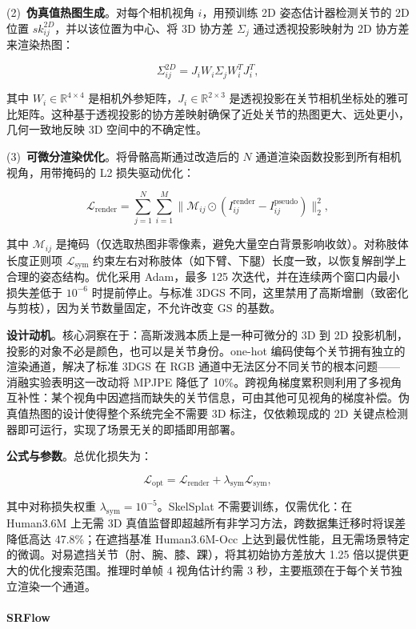(2)~\textbf{伪真值热图生成}。对每个相机视角 $i$，用预训练 2D 姿态估计器检测关节的 2D 位置 $sk_{ij}^{2D}$，并以该位置为中心、将 3D 协方差 $\Sigma_j$ 通过透视投影映射为 2D 协方差来渲染热图：

\[
\Sigma_{ij}^{2D} = J_i W_i \Sigma_j W_i^T J_i^T,
\]

其中 $W_i \in \mathbb{R}^{4 \times 4}$ 是相机外参矩阵，$J_i \in \mathbb{R}^{2 \times 3}$ 是透视投影在关节相机坐标处的雅可比矩阵。这种基于透视投影的协方差映射确保了近处关节的热图更大、远处更小，几何一致地反映 3D 空间中的不确定性。

(3)~\textbf{可微分渲染优化}。将骨骼高斯通过改造后的 $N$ 通道渲染函数投影到所有相机视角，用带掩码的 L2 损失驱动优化：

\[
\mathcal{L}_{\text{render}} = \sum_{j=1}^{N} \sum_{i=1}^{M} \| \mathcal{M}_{ij} \odot (I_{ij}^{\text{render}} - I_{ij}^{\text{pseudo}}) \|_2^2,
\]

其中 $\mathcal{M}_{ij}$ 是掩码（仅选取热图非零像素，避免大量空白背景影响收敛）。对称肢体长度正则项 $\mathcal{L}_{\text{sym}}$ 约束左右对称肢体（如下臂、下腿）长度一致，以恢复解剖学上合理的姿态结构。优化采用 Adam，最多 125 次迭代，并在连续两个窗口内最小损失差低于 $10^{-6}$ 时提前停止。与标准 3DGS 不同，这里禁用了高斯增删（致密化与剪枝），因为关节数量固定，不允许改变 $\mathrm{GS}$ 的基数。

\textbf{设计动机}。核心洞察在于：高斯泼溅本质上是一种可微分的 3D 到 2D 投影机制，投影的对象不必是颜色，也可以是关节身份。one-hot 编码使每个关节拥有独立的渲染通道，解决了标准 3DGS 在 RGB 通道中无法区分不同关节的根本问题——消融实验表明这一改动将 MPJPE 降低了 10\%。跨视角梯度累积则利用了多视角互补性：某个视角中因遮挡而缺失的关节信息，可由其他可见视角的梯度补偿。伪真值热图的设计使得整个系统完全不需要 3D 标注，仅依赖现成的 2D 关键点检测器即可运行，实现了场景无关的即插即用部署。

\textbf{公式与参数}。总优化损失为：

\[
\mathcal{L}_{\text{opt}} = \mathcal{L}_{\text{render}} + \lambda_{\text{sym}} \mathcal{L}_{\text{sym}},
\]

其中对称损失权重 $\lambda_{\text{sym}} = 10^{-5}$。SkelSplat 不需要训练，仅需优化：在 Human3.6M 上无需 3D 真值监督即超越所有非学习方法，跨数据集迁移时将误差降低高达 47.8\%；在遮挡基准 Human3.6M-Occ 上达到最优性能，且无需场景特定的微调。对易遮挡关节（肘、腕、膝、踝），将其初始协方差放大 1.25 倍以提供更大的优化搜索范围。推理时单帧 4 视角估计约需 3 秒，主要瓶颈在于每个关节独立渲染一个通道。

\paragraph{SRFlow}

